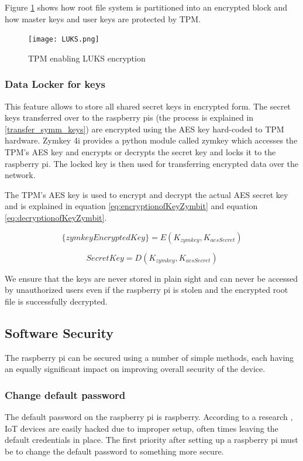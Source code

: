 \documentclass[11pt,openright]{report}
\begin{document}
Figure \ref{fig:tpmenableluks} shows how root file system is partitioned into an encrypted block and how master keys and user keys are protected by TPM.
\newpage
\hfill\\
\begin{figure}[!htbp]
	\centering
	\texttt{[image: LUKS.png]}
	\caption{TPM enabling LUKS encryption}
	\label{fig:tpmenableluks}
\end{figure}
\newline
\newline
\subsubsection{Data Locker for keys}
This feature allows to store all shared secret keys in encrypted form. The secret keys transferred over to the raspberry pis (the process is explained in \ref{transfer_symm_keys}) are encrypted using the AES key hard-coded to TPM hardware. Zymkey 4i provides a python module called zymkey which accesses the TPM's AES key and encrypts or decrypts the secret key and locks it to the raspberry pi. The locked key is then used for transferring encrypted data over the network.

The TPM's AES key is used to encrypt and decrypt the actual AES secret key and is explained in equation \ref{eq:encryptionofKeyZymbit} and equation \ref{eq:decryptionofKeyZymbit}.

\begin{equation} \label{eq:encryptionofKeyZymbit}
    \{zymkeyEncryptedKey\} =  E(K_{zymkey}, K_{aesSecret})
\end{equation}

\begin{equation} \label{eq:decryptionofKeyZymbit}
    SecretKey =  D(K_{zymkey}, K_{aesSecret})
\end{equation}

We ensure that the keys are never stored in plain sight and can never be accessed by unauthorized users even if the raspberry pi is stolen and the encrypted root file is successfully decrypted.

\subsection{Software Security}
The raspberry pi can be secured using a number of simple methods, each having an equally significant impact on improving overall security of the device.

\subsubsection{Change default password}
The default password on the raspberry pi is raspberry. According to a research \cite{8364059}, IoT devices are easily hacked due to improper setup, often times leaving the default credentials in place. The first priority after setting up a raspberry pi must be to change the default password to something more secure.
\end{document}
